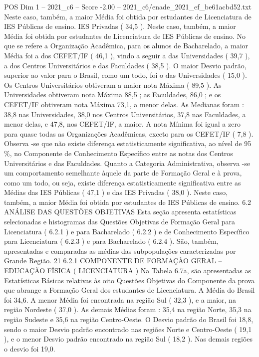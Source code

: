 \begin{textsample}{POS Dim 1 – 2021\_c6 – Score -2.00 – 2021\_c6/enade\_2021\_ef\_be61acbd52.txt}
Neste caso, também, a maior Média foi obtida por estudantes de Licenciatura de IES Públicas de ensino.
IES Privadas ( 34,5 ).
Neste caso, também, a maior Média foi obtida por estudantes de Licenciatura de IES Públicas de ensino.
No que se refere a Organização Acadêmica, para os alunos de Bacharelado, a maior Média foi a dos CEFET/IF ( 46,1 ), vindo a seguir a das Universidades ( 39,7 ), a dos Centros Universitários e das Faculdades ( 38,5 ).
O maior Desvio padrão, superior ao valor para o Brasil, como um todo, foi o das Universidades ( 15,0 ).
Os Centros Universitários obtiveram a maior nota Máxima ( 89,5 ).
As Universidades obtiveram nota Máxima 88,5 ; as Faculdades, 86,0 ; e os CEFET/IF obtiveram nota Máxima 73,1, a menor delas.
As Medianas foram : 38,8 nas Universidades, 38,0 nos Centros Universitários, 37,8 nas Faculdades, a menor delas, e 47,8, nos CEFET/IF, a maior.
A nota Mínima foi igual a zero para quase todas as Organizações Acadêmicas, exceto para os CEFET/IF ( 7,8 ).
Observa -se que não existe diferença estatisticamente significativa, ao nível de 95 \%, no Componente de Conhecimento Específico entre as notas dos Centros Universitários e das Faculdades.
Quanto a Categoria Administrativa, observa -se um comportamento semelhante àquele da parte de Formação Geral e à prova, como um todo, ou seja, existe diferença estatisticamente significativa entre as Médias das IES Públicas ( 47,1 ) e das IES Privadas ( 38,0 ).
Neste caso, também, a maior Média foi obtida por estudantes de IES Públicas de ensino. 6.2 ANÁLISE DAS QUESTÕES OBJETIVAS Esta seção apresenta estatísticas selecionadas e histogramas das Questões Objetivas de Formação Geral para Licenciatura ( 6.2.1 ) e para Bacharelado ( 6.2.2 ) e de Conhecimento Específico para Licenciatura ( 6.2.3 ) e para Bacharelado ( 6.2.4 ).
São, também, apresentadas e comparadas as médias das subpopulações caracterizadas por Grande Região. 21 6.2.1 COMPONENTE DE FORMAÇÃO GERAL – EDUCAÇÃO FÍSICA ( LICENCIATURA ) Na Tabela 6.7a, são apresentadas as Estatísticas Básicas relativas às oito Questões Objetivas do Componente da prova que abrange a Formação Geral dos estudantes de Licenciatura.
A Média do Brasil foi 34,6.
A menor Média foi encontrada na região Sul ( 32,3 ), e a maior, na região Nordeste ( 37,0 ).
As demais Médias foram : 35,4 na região Norte, 35,3 na região Sudeste e 35,6 na região Centro-Oeste.
O Desvio padrão do Brasil foi 18,8, sendo o maior Desvio padrão encontrado nas regiões Norte e Centro-Oeste ( 19,1 ), e o menor Desvio padrão encontrado na região Sul ( 18,2 ).
Nas demais regiões o desvio foi 19,0.

\end{textsample}
